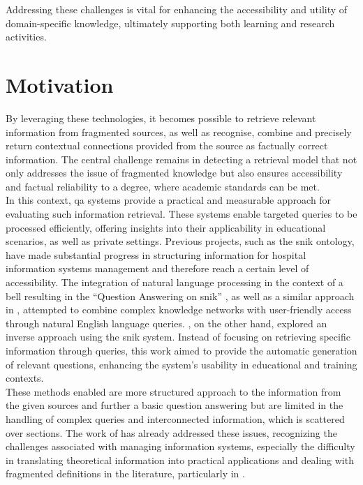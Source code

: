 Addressing these challenges is vital for enhancing the accessibility and utility of domain-specific knowledge, ultimately supporting both learning and research activities. 

\section{Motivation}\label{sec:motivation}
By leveraging these technologies, it becomes possible to retrieve relevant information from fragmented sources, as well as recognise, combine and precisely return contextual connections provided from the source as factually correct information. 
The central challenge remains in detecting a retrieval model that not only addresses the issue of fragmented knowledge but also ensures accessibility and factual reliability to a degree, where academic standards can be met.\\ 
In this context, \ac{qa} systems provide a practical and measurable approach for evaluating such information retrieval. 
These systems enable targeted queries to be processed efficiently, offering insights into their applicability in educational scenarios, as well as private settings.
% 
Previous projects, such as the \ac{snik} ontology, have made substantial progress in structuring information for hospital information systems management and therefore reach a certain level of accessibility. 
The integration of natural language processing in the context of a \ac{bell} resulting in the \enquote{Question Answering on \ac{snik}} \citep{hannesbell, hannesbell_skill}, as well as a similar approach in \citet{snikquiz}, attempted to combine complex knowledge networks with user-friendly access through natural English language queries. \citet{arneba}, on the other hand, explored an inverse approach using the \ac{snik} system. Instead of focusing on retrieving specific information through queries, this work aimed to provide the automatic generation of relevant questions, enhancing the system's usability in educational and training contexts.\\
%
These methods enabled are more structured approach to the information from the given sources and further a basic question answering but are limited in the handling of complex queries and interconnected information, which is scattered over sections.
The work of \citet{Paul_Keller} has already addressed these issues, recognizing the challenges associated with managing information systems, especially the difficulty in translating theoretical information into practical applications and dealing with fragmented definitions in the literature, particularly in \citet{bb2}. 
